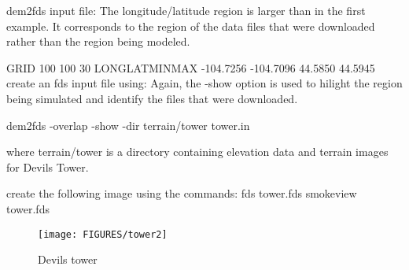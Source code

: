 dem2fds input file:
The longitude/latitude region is larger than in the first example. 
It corresponds to the region of the data files that were downloaded rather than the region being modeled.

GRID
 100 100 30
LONGLATMINMAX
 -104.7256 -104.7096 44.5850 44.5945
create an fds input file using:
Again, the -show option is used to hilight the region being simulated and identify the files that were downloaded.

dem2fds -overlap -show -dir terrain/tower tower.in

where terrain/tower is a directory containing elevation data and terrain images for Devils Tower.

create the following image using the commands:
fds tower.fds
smokeview tower.fds

\begin{figure}[bph]
\centerline{
\texttt{[image: FIGURES/tower2]}}
 \caption[FDS file overview]{Devils tower }
\label{develstower}%
\end{figure}

